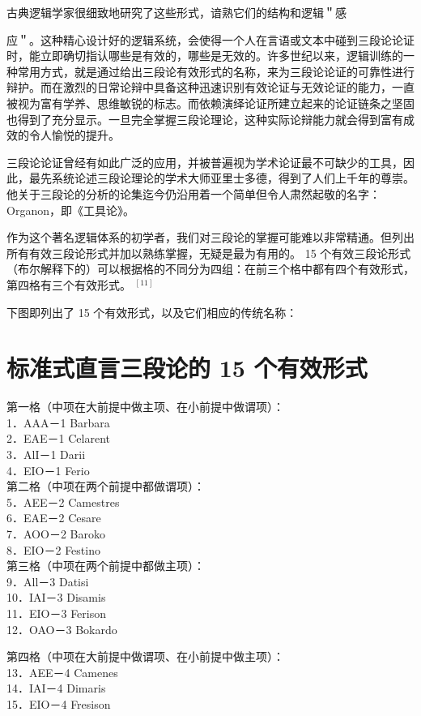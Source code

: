 古典逻辑学家很细致地研究了这些形式，谙熟它们的结构和逻辑＂感

应＂。这种精心设计好的逻辑系统，会使得一个人在言语或文本中碰到三段论论证时，能立即确切指认哪些是有效的，哪些是无效的。许多世纪以来，逻辑训练的一种常用方式，就是通过给出三段论有效形式的名称，来为三段论论证的可靠性进行辩护。而在激烈的日常论辩中具备这种迅速识别有效论证与无效论证的能力，一直被视为富有学养、思维敏锐的标志。而依赖演绎论证所建立起来的论证链条之坚固也得到了充分显示。一旦完全掌握三段论理论，这种实际论辩能力就会得到富有成效的令人愉悦的提升。

三段论论证曾经有如此广泛的应用，并被普遍视为学术论证最不可缺少的工具，因此，最先系统论述三段论理论的学术大师亚里士多德，得到了人们上千年的尊崇。他关于三段论的分析的论集迄今仍沿用着一个简单但令人肃然起敬的名字：Organon，即《工具论》。

作为这个著名逻辑体系的初学者，我们对三段论的掌握可能难以非常精通。但列出所有有效三段论形式并加以熟练掌握，无疑是最为有用的。 15 个有效三段论形式（布尔解释下的）可以根据格的不同分为四组：在前三个格中都有四个有效形式，第四格有三个有效形式。 ${ }^{[11]}$

下图即列出了 15 个有效形式，以及它们相应的传统名称：

\section*{标准式直言三段论的 15 个有效形式}
第一格（中项在大前提中做主项、在小前提中做谓项）：\\
1．AAA－1 Barbara\\
2．EAE－1 Celarent\\
3．AlI－1 Darii\\
4．EIO－1 Ferio\\
第二格（中项在两个前提中都做谓项）：\\
5．AEE－2 Camestres\\
6．EAE－2 Cesare\\
7．AOO－2 Baroko\\
8．EIO－2 Festino\\
第三格（中项在两个前提中都做主项）：\\
9．All－3 Datisi\\
10．IAI－3 Disamis\\
11．EIO－3 Ferison\\
12．OAO－3 Bokardo

第四格（中项在大前提中做谓项、在小前提中做主项）：\\
13．AEE－4 Camenes\\
14．IAI－4 Dimaris\\
15．EIO－4 Fresison 